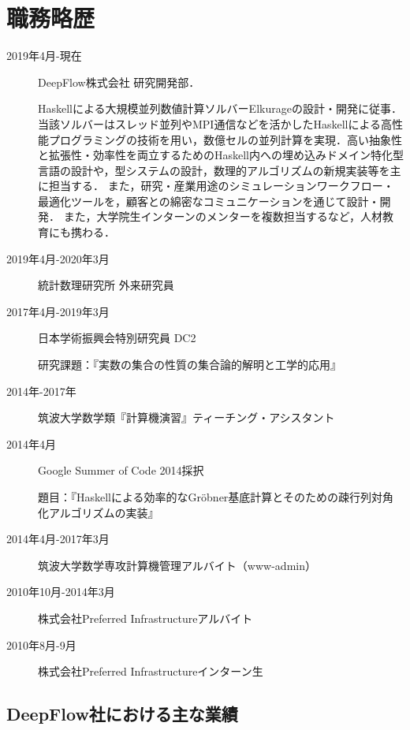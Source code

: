 \documentclass[a4j]{ltjsarticle}
\begin{document}
\section*{職務略歴}
\begin{refsection}
  \newrefcontext[labelprefix={J-}] 
\begin{description}
 \item[2019年4月-現在] DeepFlow株式会社 研究開発部．
 
  Haskellによる大規模並列数値計算ソルバーElkurageの設計・開発に従事．当該ソルバーはスレッド並列やMPI通信などを活かしたHaskellによる高性能プログラミングの技術を用い，数億セルの並列計算を実現．高い抽象性と拡張性・効率性を両立するためのHaskell内への埋め込みドメイン特化型言語の設計や，型システムの設計，数理的アルゴリズムの新規実装等を主に担当する．
  また，研究・産業用途のシミュレーションワークフロー・最適化ツールを，顧客との綿密なコミュニケーションを通じて設計・開発．
  また，大学院生インターンのメンターを複数担当するなど，人材教育にも携わる．

 \item[2019年4月-2020年3月] 統計数理研究所 外来研究員
 \item[2017年4月-2019年3月]
              日本学術振興会特別研究員 DC2

              研究課題：『実数の集合の性質の集合論的解明と工学的応用』
 \item[2014年-2017年] 筑波大学数学類『計算機演習』ティーチング・アシスタント
 \item[2014年4月] Google Summer of Code 2014採択

            題目：『Haskellによる効率的なGr\"{o}bner基底計算とそのための疎行列対角化アルゴリズムの実装』
 \item[2014年4月-2017年3月] 筑波大学数学専攻計算機管理アルバイト（www-admin）
 \item[2010年10月-2014年3月] 株式会社Preferred Infrastructureアルバイト
 \item[2010年8月-9月] 株式会社Preferred Infrastructureインターン生
\end{description}

\subsection*{DeepFlow社における主な業績}


\end{refsection}
\end{document}
